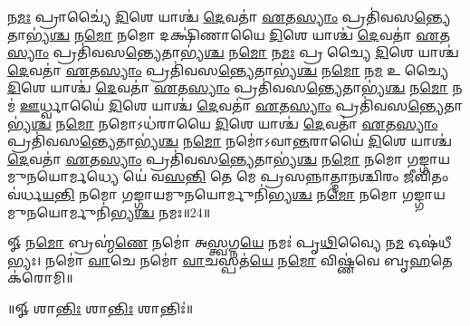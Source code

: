 𑌨\ul{𑌮𑌃} 𑌪𑍍𑌰𑌾𑌚𑍍𑌯𑍈॑ \ul{𑌦𑌿}𑌶𑍇 𑌯𑌾𑌶𑍍𑌚॑ \ul{𑌦𑍇}𑌵𑌤𑌾॑ \ul{𑌏}𑌤\ul{𑌸𑍍𑌯𑌾𑌂} 𑌪𑍍𑌰𑌤𑌿॑𑌵𑌸\ul{𑌨𑍍𑌤𑍍𑌯𑍇}𑌤𑌾𑌭𑍍𑌯॑\ul{𑌶𑍍𑌚}  𑌨\ul{𑌮𑍋} 𑌨𑌮𑍋 𑌦𑌕𑍍𑌷𑌿॑𑌣𑌾𑌯𑍈 \ul{𑌦𑌿}𑌶𑍇 𑌯𑌾𑌶𑍍𑌚॑ \ul{𑌦𑍇}𑌵𑌤𑌾॑ \ul{𑌏}𑌤\ul{𑌸𑍍𑌯𑌾𑌂} 𑌪𑍍𑌰𑌤𑌿॑𑌵𑌸\ul{𑌨𑍍𑌤𑍍𑌯𑍇}𑌤𑌾𑌭𑍍𑌯॑\ul{𑌶𑍍𑌚}  𑌨\ul{𑌮𑍋} 𑌨\ul{𑌮𑌃} 𑌪𑍍𑌰𑌤𑍀᳚𑌚𑍍𑌯𑍈 \ul{𑌦𑌿}𑌶𑍇 𑌯𑌾𑌶𑍍𑌚॑ \ul{𑌦𑍇}𑌵𑌤𑌾॑ \ul{𑌏}𑌤\ul{𑌸𑍍𑌯𑌾𑌂} 𑌪𑍍𑌰𑌤𑌿॑𑌵𑌸\ul{𑌨𑍍𑌤𑍍𑌯𑍇}𑌤𑌾𑌭𑍍𑌯॑\ul{𑌶𑍍𑌚}  𑌨\ul{𑌮𑍋} 𑌨\ul{𑌮} 𑌉𑌦𑍀᳚𑌚𑍍𑌯𑍈 \ul{𑌦𑌿}𑌶𑍇 𑌯𑌾𑌶𑍍𑌚॑ \ul{𑌦𑍇}𑌵𑌤𑌾॑ \ul{𑌏}𑌤\ul{𑌸𑍍𑌯𑌾𑌂} 𑌪𑍍𑌰𑌤𑌿॑𑌵𑌸\ul{𑌨𑍍𑌤𑍍𑌯𑍇}𑌤𑌾𑌭𑍍𑌯॑\ul{𑌶𑍍𑌚}  𑌨\ul{𑌮𑍋} 𑌨𑌮॑ \ul{𑌊}𑌰𑍍𑌧𑍍𑌵𑌾𑌯𑍈॑ \ul{𑌦𑌿}𑌶𑍇 𑌯𑌾𑌶𑍍𑌚॑ \ul{𑌦𑍇}𑌵𑌤𑌾॑ \ul{𑌏}𑌤\ul{𑌸𑍍𑌯𑌾𑌂} 𑌪𑍍𑌰𑌤𑌿॑𑌵𑌸\ul{𑌨𑍍𑌤𑍍𑌯𑍇}𑌤𑌾𑌭𑍍𑌯॑\ul{𑌶𑍍𑌚}  𑌨\ul{𑌮𑍋} 𑌨𑌮𑍋𑌽𑌧॑𑌰𑌾𑌯𑍈 \ul{𑌦𑌿}𑌶𑍇 𑌯𑌾𑌶𑍍𑌚॑ \ul{𑌦𑍇}𑌵𑌤𑌾॑ \ul{𑌏}𑌤\ul{𑌸𑍍𑌯𑌾𑌂} 𑌪𑍍𑌰𑌤𑌿॑𑌵𑌸\ul{𑌨𑍍𑌤𑍍𑌯𑍇}𑌤𑌾𑌭𑍍𑌯॑\ul{𑌶𑍍𑌚}  𑌨\ul{𑌮𑍋} 𑌨𑌮𑍋॑𑌽𑌵𑌾\ul{𑌨𑍍𑌤}𑌰𑌾𑌯𑍈॑ \ul{𑌦𑌿}𑌶𑍇 𑌯𑌾𑌶𑍍𑌚॑ \ul{𑌦𑍇}𑌵𑌤𑌾॑ \ul{𑌏}𑌤\ul{𑌸𑍍𑌯𑌾𑌂} 𑌪𑍍𑌰𑌤𑌿॑𑌵𑌸\ul{𑌨𑍍𑌤𑍍𑌯𑍇}𑌤𑌾𑌭𑍍𑌯॑\ul{𑌶𑍍𑌚}  𑌨\ul{𑌮𑍋} 𑌨𑌮𑍋 𑌗𑌙𑍍𑌗𑌾𑌯𑌮𑍁𑌨𑌯𑍋𑌰𑍍𑌮𑌧𑍍𑌯𑍇 𑌯𑍇॑ 𑌵\ul{𑌸}\ul{𑌨𑍍𑌤𑌿} 𑌤𑍇 𑌮𑍇 𑌪𑍍𑌰𑌸𑌨𑍍𑌨𑌾𑌤𑍍𑌮𑌾𑌨𑌶𑍍𑌚𑌿𑌰𑌂 𑌜𑍀𑌵𑌿𑌤𑌂 𑌵॑𑌰𑍍𑌧\ul{𑌯}\ul{𑌨𑍍𑌤𑌿} 𑌨𑌮𑍋 𑌗𑌙𑍍𑌗𑌾𑌯𑌮𑍁𑌨𑌯𑍋𑌰𑍍𑌮𑍁𑌨𑌿॑𑌭𑍍𑌯\ul{𑌶𑍍𑌚} 𑌨\ul{𑌮𑍋} 𑌨𑌮𑍋 𑌗𑌙𑍍𑌗𑌾𑌯𑌮𑍁𑌨𑌯𑍋𑌰𑍍𑌮𑍁𑌨𑌿॑𑌭𑍍𑌯\ul{𑌶𑍍𑌚} 𑌨𑌮𑌃॥24॥
\anuvakamend

𑍐 𑌨\ul{𑌮𑍋} 𑌬𑍍𑌰𑌹𑍍𑌮॑\ul{𑌣𑍇} 𑌨𑌮𑍋॑ 𑌅\ul{𑌸𑍍𑌤𑍍𑌵}𑌗𑍍𑌨\ul{𑌯𑍇} 𑌨𑌮𑌃॑ 𑌪𑍃\ul{𑌥𑌿}𑌵𑍍𑌯𑍈 𑌨\ul{𑌮} 𑌓𑌷॑𑌧𑍀𑌭𑍍𑌯𑌃। 
𑌨𑌮𑍋॑ \ul{𑌵𑌾}𑌚𑍇 𑌨𑌮𑍋॑ \ul{𑌵𑌾}𑌚𑌸𑍍𑌪𑌤॑\ul{𑌯𑍇} 𑌨\ul{𑌮𑍋} 𑌵𑌿𑌷𑍍𑌣॑𑌵𑍇 𑌬𑍃\ul{𑌹}𑌤𑍇 𑌕॑𑌰𑍋𑌮𑌿॥\\
\centerline{॥𑍐 𑌶𑌾\ul{𑌨𑍍𑌤𑌿𑌃} 𑌶𑌾\ul{𑌨𑍍𑌤𑌿𑌃} 𑌶𑌾𑌨𑍍𑌤𑌿𑌃॑॥}
